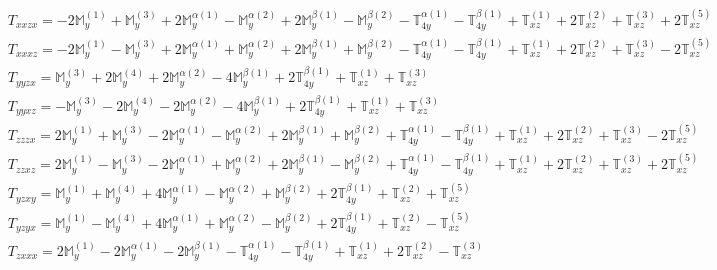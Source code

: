 \documentclass[fleqn,8pt,landscape]{jsarticle}
\begin{document}
\begin{align*}
& T_{xxzx} = - 2 \mathbb{M}_{y}^{(1)} + \mathbb{M}_{y}^{(3)} + 2 \mathbb{M}_{y}^{\alpha(1)} - \mathbb{M}_{y}^{\alpha(2)} + 2 \mathbb{M}_{y}^{\beta(1)} - \mathbb{M}_{y}^{\beta(2)} - \mathbb{T}_{4y}^{\alpha(1)} - \mathbb{T}_{4y}^{\beta(1)} + \mathbb{T}_{xz}^{(1)} + 2 \mathbb{T}_{xz}^{(2)} + \mathbb{T}_{xz}^{(3)} + 2 \mathbb{T}_{xz}^{(5)} \\
& T_{xxxz} = - 2 \mathbb{M}_{y}^{(1)} - \mathbb{M}_{y}^{(3)} + 2 \mathbb{M}_{y}^{\alpha(1)} + \mathbb{M}_{y}^{\alpha(2)} + 2 \mathbb{M}_{y}^{\beta(1)} + \mathbb{M}_{y}^{\beta(2)} - \mathbb{T}_{4y}^{\alpha(1)} - \mathbb{T}_{4y}^{\beta(1)} + \mathbb{T}_{xz}^{(1)} + 2 \mathbb{T}_{xz}^{(2)} + \mathbb{T}_{xz}^{(3)} - 2 \mathbb{T}_{xz}^{(5)} \\
& T_{yyzx} = \mathbb{M}_{y}^{(3)} + 2 \mathbb{M}_{y}^{(4)} + 2 \mathbb{M}_{y}^{\alpha(2)} - 4 \mathbb{M}_{y}^{\beta(1)} + 2 \mathbb{T}_{4y}^{\beta(1)} + \mathbb{T}_{xz}^{(1)} + \mathbb{T}_{xz}^{(3)} \\
& T_{yyxz} = - \mathbb{M}_{y}^{(3)} - 2 \mathbb{M}_{y}^{(4)} - 2 \mathbb{M}_{y}^{\alpha(2)} - 4 \mathbb{M}_{y}^{\beta(1)} + 2 \mathbb{T}_{4y}^{\beta(1)} + \mathbb{T}_{xz}^{(1)} + \mathbb{T}_{xz}^{(3)} \\
& T_{zzzx} = 2 \mathbb{M}_{y}^{(1)} + \mathbb{M}_{y}^{(3)} - 2 \mathbb{M}_{y}^{\alpha(1)} - \mathbb{M}_{y}^{\alpha(2)} + 2 \mathbb{M}_{y}^{\beta(1)} + \mathbb{M}_{y}^{\beta(2)} + \mathbb{T}_{4y}^{\alpha(1)} - \mathbb{T}_{4y}^{\beta(1)} + \mathbb{T}_{xz}^{(1)} + 2 \mathbb{T}_{xz}^{(2)} + \mathbb{T}_{xz}^{(3)} - 2 \mathbb{T}_{xz}^{(5)} \\
& T_{zzxz} = 2 \mathbb{M}_{y}^{(1)} - \mathbb{M}_{y}^{(3)} - 2 \mathbb{M}_{y}^{\alpha(1)} + \mathbb{M}_{y}^{\alpha(2)} + 2 \mathbb{M}_{y}^{\beta(1)} - \mathbb{M}_{y}^{\beta(2)} + \mathbb{T}_{4y}^{\alpha(1)} - \mathbb{T}_{4y}^{\beta(1)} + \mathbb{T}_{xz}^{(1)} + 2 \mathbb{T}_{xz}^{(2)} + \mathbb{T}_{xz}^{(3)} + 2 \mathbb{T}_{xz}^{(5)} \\
& T_{yzxy} = \mathbb{M}_{y}^{(1)} + \mathbb{M}_{y}^{(4)} + 4 \mathbb{M}_{y}^{\alpha(1)} - \mathbb{M}_{y}^{\alpha(2)} + \mathbb{M}_{y}^{\beta(2)} + 2 \mathbb{T}_{4y}^{\beta(1)} + \mathbb{T}_{xz}^{(2)} + \mathbb{T}_{xz}^{(5)} \\
& T_{yzyx} = \mathbb{M}_{y}^{(1)} - \mathbb{M}_{y}^{(4)} + 4 \mathbb{M}_{y}^{\alpha(1)} + \mathbb{M}_{y}^{\alpha(2)} - \mathbb{M}_{y}^{\beta(2)} + 2 \mathbb{T}_{4y}^{\beta(1)} + \mathbb{T}_{xz}^{(2)} - \mathbb{T}_{xz}^{(5)} \\
& T_{zxxx} = 2 \mathbb{M}_{y}^{(1)} - 2 \mathbb{M}_{y}^{\alpha(1)} - 2 \mathbb{M}_{y}^{\beta(1)} - \mathbb{T}_{4y}^{\alpha(1)} - \mathbb{T}_{4y}^{\beta(1)} + \mathbb{T}_{xz}^{(1)} + 2 \mathbb{T}_{xz}^{(2)} - \mathbb{T}_{xz}^{(3)} \\

\end{align*}
\end{document}
